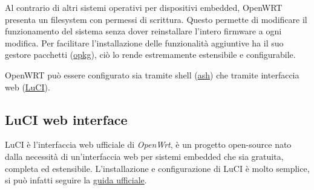 Al contrario di altri sistemi operativi per dispositivi embedded, OpenWRT presenta un filesystem con permessi di scrittura. Questo permette di modificare il funzionamento del sistema senza dover reinstallare l'intero firmware a ogni modifica. Per facilitare l'installazione delle funzionalità aggiuntive ha il suo gestore pacchetti (\href{https://openwrt.org/docs/guide-user/additional-software/opkg}{opkg}), ciò lo rende estremamente estensibile e configurabile.

OpenWRT può essere configurato sia tramite shell (\href{https://en.wikipedia.org/wiki/Almquist_shell}{ash}) che tramite interfaccia web (\href{https://openwrt.org/docs/guide-user/luci/start}{LuCI}).

\subsection{LuCI web interface}

LuCI è l'interfaccia web ufficiale di \textit{OpenWrt}, è un progetto open-source nato dalla necessità di un'interfaccia web per sistemi embedded che sia gratuita, completa ed estensibile. L'installazione e configurazione di LuCI è molto semplice, si può infatti seguire la \href{https://openwrt.org/docs/guide-user/luci/luci.essentials}{guida ufficiale}.


